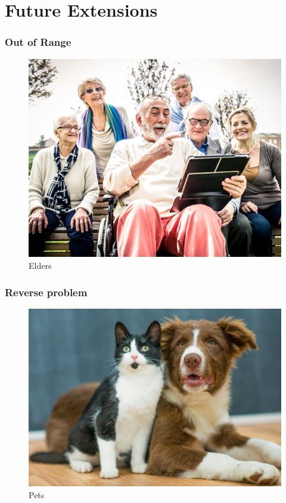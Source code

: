 \documentclass{beamer}
\begin{document}
\section{Future Extensions}
\begin{frame}\frametitle{Out of Range}
\begin{figure}[h!]
   \begin{center}
   \includegraphics[scale=0.3]{elders.jpg}
   \end{center}
   \caption{Elders}
\end{figure}
\end{frame}

\begin{frame}\frametitle{Reverse problem}
\begin{figure}[h!]
   \begin{center}
   \includegraphics[scale=0.2]{pets.jpg}
   \end{center}
   \caption{Pets}
   \end{figure}
\end{frame}
\end{document}
